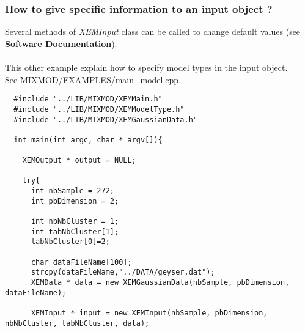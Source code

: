 \subsubsection{How to give specific information to an input object ?\\}
Several methods of {\it XEMInput} class can be called to change default values (see {\bf Software Documentation}).\\
\\
This other example explain how to specify model types in the input object.\\
See MIXMOD/EXAMPLES/main\_model.cpp.
{\scriptsize
\begin{verbatim}
  #include "../LIB/MIXMOD/XEMMain.h"
  #include "../LIB/MIXMOD/XEMModelType.h"
  #include "../LIB/MIXMOD/XEMGaussianData.h"

  int main(int argc, char * argv[]){

    XEMOutput * output = NULL;

    try{
      int nbSample = 272;
      int pbDimension = 2;

      int nbNbCluster = 1;
      int tabNbCluster[1];
      tabNbCluster[0]=2;

      char dataFileName[100];
      strcpy(dataFileName,"../DATA/geyser.dat");
      XEMData * data = new XEMGaussianData(nbSample, pbDimension, dataFileName);

      XEMInput * input = new XEMInput(nbSample, pbDimension, nbNbCluster, tabNbCluster, data);


\end{verbatim}}
